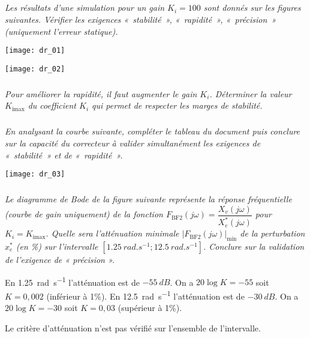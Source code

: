 \begin{multicols}{2}
\subparagraph{}\textit{Les résultats d’une simulation pour un gain $K_i = 100$ sont donnés sur les figures suivantes. Vérifier les exigences «~stabilité~», «~rapidité~», «~précision~» (uniquement l’erreur statique).}
\ifprof
\begin{corrige}
\end{corrige}
\else
\fi


\begin{center}
\texttt{[image: dr\_01]}
\end{center}

\begin{center}
\texttt{[image: dr\_02]}
\end{center}


\subparagraph{}\textit{Pour améliorer la rapidité, il faut augmenter le gain $K_i$. Déterminer la valeur $K_{\text{imax}}$ du
coefficient $K_i$ qui permet de respecter les marges de stabilité.}
\ifprof
\begin{corrige}
\end{corrige}
\else
\fi

\subparagraph{}\textit{En analysant la courbe suivante, compléter le tableau du document puis conclure sur la capacité du correcteur à valider simultanément les exigences de «~stabilité~» et de «~rapidité~».}
\ifprof
\begin{corrige}
\end{corrige}
\else
\fi
\begin{center}
\texttt{[image: dr\_03]}
\end{center}


\subparagraph{}\textit{Le diagramme de Bode de la figure suivante représente la réponse fréquentielle (courbe de gain
uniquement) de la fonction $F_{\text{BF2}} (j\omega) = \dfrac{X_v(j\omega)}{X_e^*(j\omega)}$
pour $K_i = K_{\text{imax}}$. Quelle sera l’atténuation minimale $\left|F_{\text{BF2}}\left(j\omega\right)\right|_{\text{min}}$
de la perturbation $x_e^*$ (en \%) sur l’intervalle $[\SI{1,25}{rad.s^{-1}};\SI{12,5}{rad.s^{-1}}]$.
Conclure sur la validation de l’exigence de « précision ».}
\ifprof
\begin{corrige}
En \SI{1,25}{rad.s^{-1}} l'atténuation est de $\SI{-55}{dB}$. On a $20\log K = -55$ soit $K=0,002$ (inférieur à 1\%). 
En \SI{12,5}{rad.s^{-1}} l'atténuation est de $\SI{-30}{dB}$. On a $20\log K = -30$ soit $K=0,03$ (supérieur à 1\%). 

Le critère d'atténuation n'est pas vérifié sur l'ensemble de l'intervalle.
\end{corrige}
\else
\fi




\end{multicols}
